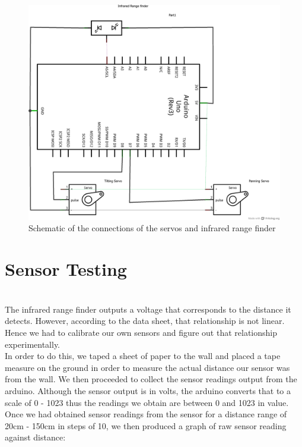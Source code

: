\documentclass{article}
\begin{document}
\begin{figure}[h!]
\begin{center}
\includegraphics[scale=0.4, angle=270]{schematic.png}
\caption{Schematic of the connections of the servos and infrared range finder}
\end{center}
\end{figure}

\section{Sensor Testing} \ \\
The infrared range finder outputs a voltage that corresponds to the distance it detects. However, according to the data sheet, that relationship is not linear. Hence we had to calibrate our own sensors and figure out that relationship experimentally. \\

In order to do this, we taped a sheet of paper to the wall and placed a tape measure on the ground in order to measure the actual distance our sensor was from the wall. We then proceeded to collect the sensor readings output from the arduino. Although the sensor output is in volts, the arduino converts that to a scale of 0 - 1023 thus the readings we obtain are between 0 and 1023 in value. \\

Once we had obtained sensor readings from the sensor for a distance range of 20cm - 150cm in steps of 10, we then produced a graph of raw sensor reading against distance:
\end{document}
